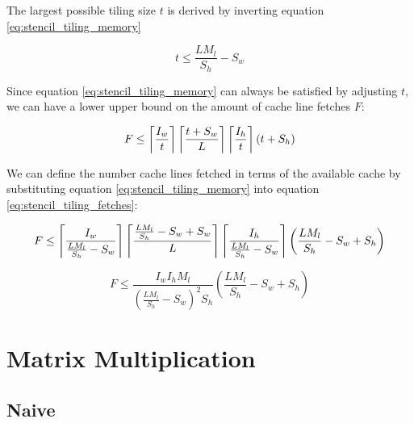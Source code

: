 The largest possible tiling size $t$ is derived by inverting equation \ref{eq:stencil_tiling_memory}

\begin{equation}
    t \leq \frac{L M_l}{S_h} - S_w
\end{equation}

Since equation \ref{eq:stencil_tiling_memory} can always be satisfied by adjusting $t$, we can have a lower upper bound on the amount of cache line fetches $F$:

\begin{equation}
    F \leq \left\lceil \frac{I_w}{t} \right\rceil \left\lceil \frac{t + S_w}{L} \right\rceil \left\lceil \frac{I_h}{t} \right\rceil (t + S_h)
    \label{eq:stencil_tiling_fetches}
\end{equation}

We can define the number cache lines fetched in terms of the available cache by substituting equation \ref{eq:stencil_tiling_memory} into equation \ref{eq:stencil_tiling_fetches}:

\begin{equation}
    F \leq \left\lceil \frac{I_w}{\frac{L M_l}{S_h} - S_w} \right\rceil \left\lceil \frac{\frac{L M_l}{S_h} - S_w + S_w}{L} \right\rceil \left\lceil \frac{I_h}{\frac{L M_l}{S_h} - S_w} \right\rceil \left(\frac{L M_l}{S_h} - S_w + S_h\right)
\end{equation}

\begin{equation}
    F \leq \frac{I_w I_h M_l}{(\frac{L M_l}{S_h} - S_w)^2 S_h} (\frac{L M_l}{S_h} - S_w + S_h)
\end{equation}



\section{Matrix Multiplication}

\subsection{Naive}

